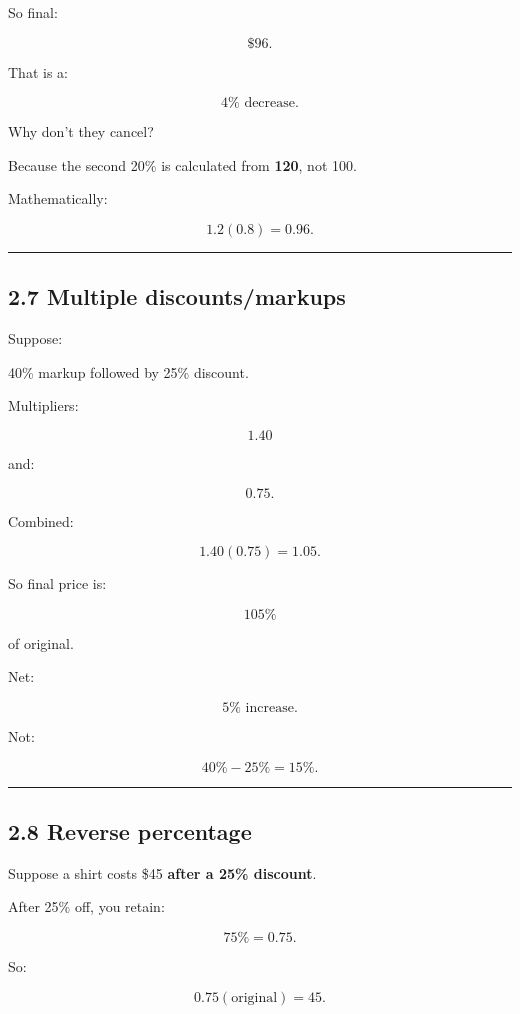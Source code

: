 \documentclass[
]{article}
\begin{document}
So final:

\[
\$96.
\]

That is a:

\[
\boxed{4\%\text{ decrease}}.
\]

Why don't they cancel?

Because the second 20\% is calculated from \textbf{120}, not 100.

Mathematically:

\[
1.2(0.8)=0.96.
\]

\begin{center}\rule{0.5\linewidth}{0.5pt}\end{center}

\subsection{2.7 Multiple
discounts/markups}\label{multiple-discountsmarkups}

Suppose:

40\% markup followed by 25\% discount.

Multipliers:

\[
1.40
\]

and:

\[
0.75.
\]

Combined:

\[
1.40(0.75)=1.05.
\]

So final price is:

\[
105\%
\]

of original.

Net:

\[
\boxed{5\%\text{ increase}}.
\]

Not:

\[
40\%-25\%=15\%.
\]

\begin{center}\rule{0.5\linewidth}{0.5pt}\end{center}

\subsection{2.8 Reverse percentage}\label{reverse-percentage}

Suppose a shirt costs \$45 \textbf{after a 25\% discount}.

After 25\% off, you retain:

\[
75\%=0.75.
\]

So:

\[
0.75(\text{original})=45.
\]
\end{document}

